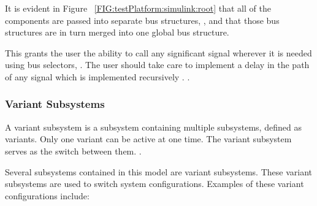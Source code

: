 \documentclass[crop=false,float=true,class=scrreprt]{standalone}
\begin{document}
It is evident in Figure~%
\ref{FIG:testPlatform:simulink:root}
that all of the components are passed into separate bus structures,
{},
and that those bus structures are in turn merged into one global bus structure.

This grants the user the ability to call any significant signal wherever it is needed
using bus selectors,
{}.
The user should take care to implement a delay in the path of any signal which is implemented recursively
{}. 
{}.




\subsubsection{Variant Subsystems}
\label{SEC:testPlatform:simulink:root:variant}

A variant subsystem is a subsystem containing multiple subsystems, defined as variants.
Only one variant can be active at one time.
The variant subsystem serves as the switch between them.
{}.

Several subsystems contained in this model
are variant subsystems.
These variant subsystems are used to switch system configurations.
Examples of these variant configurations include:
\end{document}
